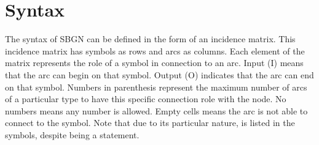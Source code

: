 \color{red}
\section{Syntax}


The syntax of SBGN \ERs can be defined in the form of an incidence matrix. This incidence matrix has symbols as rows and arcs as columns. Each element of the matrix represents the role of a symbol in connection to an arc. Input (I) means that the arc can begin on that symbol. Output (O) indicates that the arc can end on that symbol. Numbers in parenthesis represent the maximum number of arcs of a particular type to have this specific connection role with the node. No numbers means any number is allowed. Empty cells means the arc is not able to connect to the symbol. Note that due to its particular nature,  is listed in the symbols, despite being a statement.

